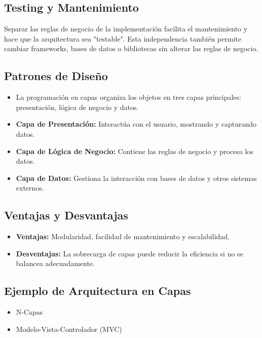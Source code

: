 \begin{center}
    \subsection{Testing y Mantenimiento}
    Separar las reglas de negocio de la implementación facilita el mantenimiento y hace que la arquitectura sea "testable". 
    Esta independencia también permite cambiar frameworks, bases de datos o bibliotecas sin alterar las reglas de negocio.

    \subsection{Patrones de Diseño}

    \begin{itemize}
        \item La programación en capas organiza los objetos en tres capas principales: presentación, lógica de negocio y datos.
        \item \textbf{Capa de Presentación:} Interactúa con el usuario, mostrando y capturando datos.
        \item \textbf{Capa de Lógica de Negocio:} Contiene las reglas de negocio y procesa los datos.
        \item \textbf{Capa de Datos:} Gestiona la interacción con bases de datos y otros sistemas externos.
    \end{itemize}

    \subsection{Ventajas y Desvantajas}
    \begin{itemize}
        \item \textbf{Ventajas:} Modularidad, facilidad de mantenimiento y escalabilidad.
        \item \textbf{Desventajas:} La sobrecarga de capas puede reducir la eficiencia si no se balancea adecuadamente.
    \end{itemize}

    \subsection{Ejemplo de Arquitectura en Capas}

    \begin{itemize}
        \item N-Capas
        \item Modelo-Vista-Controlador (MVC)
    \end{itemize}


\end{center}